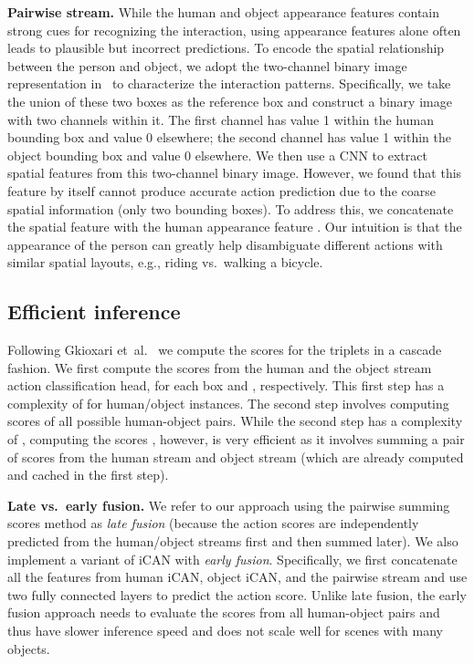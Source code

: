 \documentclass{bmvc2k}
\def\etal{et~al.}			  \def\eg{e.g.,~}               \def\ie{i.e.,~}               \def\etc{etc}                 \def\cf{cf.~}                 \def\viz{viz.~}               \def\vs{vs.~}
\newlength\secmargin
\newcommand {\para}[1]{\vspace{1.5mm} \noindent \textbf{#1}}
\begin{document}
\para{Pairwise stream.}
While the human and object appearance features contain strong cues for recognizing the interaction, using appearance features alone often leads to plausible but incorrect predictions.
To encode the spatial relationship between the person and object, we adopt the two-channel binary image representation in~\cite{Chao-WACV-HOI} to characterize the interaction patterns. 
Specifically, we take the union of these two boxes as the reference box and construct a binary image with two channels within it. 
The first channel has value 1 within the human bounding box and value 0 elsewhere; the second channel has value 1 within the object bounding box and value 0 elsewhere. 
We then use a CNN to extract spatial features from this two-channel binary image.
However, we found that this feature by itself cannot produce accurate action prediction due to the coarse spatial information (only two bounding boxes).
To address this, we concatenate the spatial feature with the human appearance feature .
Our intuition is that the appearance of the person can greatly help disambiguate different actions with similar spatial layouts, e.g., riding \vs walking a bicycle.


\subsection{Efficient inference}
\label{sec:inference}
\vspace{\secmargin}

Following Gkioxari \etal~\cite{Gkioxari-CVPR-InteractNet} we compute the scores for the triplets in a cascade fashion.
We first compute the scores from the human and the object stream action classification head, for each box  and , respectively. 
This first step has a complexity of  for  human/object instances.
The second step involves computing scores of all possible human-object pairs.
While the second step has a complexity of , computing the scores , however, is very efficient as it involves summing a pair of scores from the human stream  and object stream  (which are already computed and cached in the first step).

\para{Late \vs early fusion.} We refer to our approach using the pairwise summing scores method as \emph{late fusion} (because the action scores are independently predicted from the human/object streams first and then summed later).
We also implement a variant of iCAN with \emph{early fusion}. 
Specifically, we first concatenate all the features from human iCAN, object iCAN, and the pairwise stream and use two fully connected layers to predict the action score.
Unlike late fusion, the early fusion approach needs to evaluate the scores from all human-object pairs and thus have slower inference speed and does not scale well for scenes with many objects.
\end{document}
